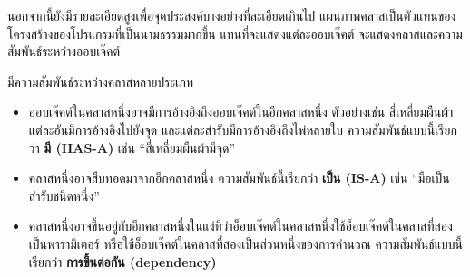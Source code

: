 
นอกจากนี้ยังมีรายละเอียดสูงเพื่อจุดประสงค์บางอย่างที่ละเอียดเกินไป 
แผนภาพคลาสเป็นตัวแทนของโครงสร้างของโปรแกรมที่เป็นนามธรรมมากขึ้น 
แทนที่จะแสดงแต่ละออบเจ๊คต์ จะแสดงคลาสและความสัมพันธ์ระหว่างออบเจ๊คต์


มีความสัมพันธ์ระหว่างคลาสหลายประเภท

\begin{itemize}


\item ออบเจ๊คต์ในคลาสหนึ่งอาจมีการอ้างอิงถึงออบเจ๊คต์ในอีกคลาสหนึ่ง ตัวอย่างเช่น สี่เหลี่ยมผืนผ้าแต่ละอันมีการอ้างอิงไปยังจุด 
และแต่ละสำรับมีการอ้างอิงถึงไพ่หลายใบ ความสัมพันธ์แบบนี้เรียกว่า {\bf มี (HAS-A)} เช่น ``สี่เหลี่ยมผืนผ้ามีจุด''


\item คลาสหนึ่งอาจสืบทอดมาจากอีกคลาสหนึ่ง ความสัมพันธ์นี้เรียกว่า {\bf เป็น (IS-A)} เช่น ``มือเป็นสำรับชนิดหนึ่ง''


\item คลาสหนึ่งอาจขึ้นอยู่กับอีกคลาสหนึ่งในแง่ที่ว่าอ็อบเจ๊คต์ในคลาสหนึ่งใช้อ็อบเจ๊คต์ในคลาสที่สองเป็นพารามิเตอร์ 
หรือใช้อ็อบเจ๊คต์ในคลาสที่สองเป็นส่วนหนึ่งของการคำนวณ ความสัมพันธ์แบบนี้เรียกว่า {\bf การขึ้นต่อกัน (dependency)}

\end{itemize}

